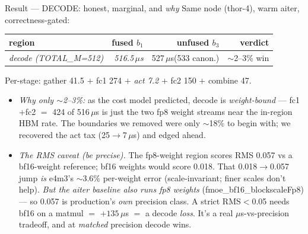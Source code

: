 \documentclass[pdf,aspectratio=169]{beamer}
\newcommand{\empy}[1]{{\color{darkorange}\emph{#1}}}
\newcommand{\empr}[1]{{\color{cardinalred}\emph{#1}}}
\newcommand{\mc}[1]{{\ttfamily\small #1}}
\begin{document}
\begin{frame}{Result --- DECODE: honest, marginal, and \emph{why}}
\footnotesize
Same node (thor-4), warm aiter, correctness-gated:
\begin{center}
\begin{tabular}{lrrr}
\toprule
region & fused $b_1$ & unfused $b_3$ & verdict \\
\midrule
\empy{decode (TOTAL\_M=512)} & \empr{516.5\,$\mu$s} & 527\,$\mu$s\;(533 canon.) & $\sim$2--3\% win \\
\bottomrule
\end{tabular}
\end{center}
Per-stage: gather 41.5 $+$ fc1 274 $+$ \empy{act 7.2} $+$ fc2 150 $+$ combine 47.
\begin{itemize}\footnotesize
  \item \empr{Why only $\sim$2--3\%:} as the cost model predicted, decode is \empy{weight-bound} --- fc1$+$fc2 $=$ 424 of 516\,$\mu$s is just the two fp8 weight streams near the in-region HBM rate. The boundaries we removed were only $\sim$18\% to begin with; we recovered the act tax (25$\to$7\,$\mu$s) and edged ahead.
  \item \empr{The RMS caveat (be precise).} The fp8-weight region scores RMS 0.057 vs a bf16-weight reference; bf16 weights would score 0.018. That 0.018$\to$0.057 jump \emph{is} e4m3's $\sim$3.6\% per-weight error (scale-invariant; finer scales don't help). \empy{But the aiter baseline \emph{also} runs fp8 weights} (\mc{fmoe\_bf16\_blockscaleFp8}) --- so 0.057 is production's \emph{own} precision class. A strict RMS$<$0.05 needs bf16 on a matmul $=$ $+135\,\mu$s $=$ a decode \emph{loss}. It's a real $\mu$s-vs-precision tradeoff, and at \emph{matched} precision decode wins.
\end{itemize}
\end{frame}
\end{document}
